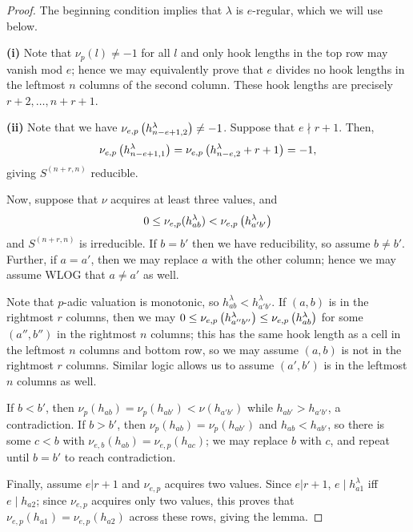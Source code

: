 \documentclass{amsart}
\begin{document}
  \begin{proof}
    The beginning condition implies that $\lambda$ is $e$-regular, which we will use below.

    \textbf{(i)}
    Note that $\nu_p(l) \neq -1$ for all $l$ and only hook lengths in the top row may vanish mod $e$;
    hence we may equivalently prove that $e$ divides no hook lengths in the leftmost $n$ columns of the second column.
    These hook lengths are precisely $r + 2,\dots,n+r+1$.

    \textbf{(ii)}
    Note that we have $\nu_{e,p}\left( h^\lambda_{n-e+1,2} \right) \neq -1$.
    Suppose that $e \nmid r + 1$.
    Then, \[\nu_{e,p}\left( h^\lambda_{n-e+1,1} \right) = \nu_{e,p}\left( h^\lambda_{n-e,2} + r + 1 \right) = -1,\]
    giving $S^{(n+r,n)}$ reducible.

    \def\corsecsep{5pt}
    \vspace{\corsecsep}
    Now, suppose that $\nu$ acquires at least three values, and \[0 \leq \nu_{e,p}(h^{\lambda}_{ab}) < \nu_{e,p}\left( h^{\lambda}_{a'b'} \right)\] and $S^{(n+r,n)}$ is irreducible.
    If $b=b'$ then we have reducibility, so assume $b \neq b'$.
    Further, if $a = a'$, then we may replace $a$ with the other column;
    hence we may assume WLOG that $a \neq a'$ as well.

    Note that $p$-adic valuation is monotonic, so $h^\lambda_{ab} < h^\lambda_{a'b'}$.
    If $(a,b)$ is in the rightmost $r$ columns, then we may $0 \leq \nu_{e,p}\left( h^\lambda_{a''b''} \right) \leq \nu_{e,p}\left( h^\lambda_{ab} \right)$ for some $(a'',b'')$ in the rightmost $n$ columns;
    this has the same hook length as a cell in the leftmost $n$ columns and bottom row, so we may assume $(a,b)$ is not in the rightmost $r$ columns.
    Similar logic allows us to assume $(a',b')$ is in the leftmost $n$ columns as well.

    If $b < b'$, then $\nu_p(h_{ab}) = \nu_p(h_{ab'}) < \nu(h_{a'b'})$ while $h_{ab'} > h_{a'b'}$, a contradiction.
    If $b > b'$, then $\nu_p(h_{ab}) = \nu_p(h_{ab'})$ and $h_{ab} < h_{ab'}$, so there is some $c < b$ with $\nu_{e,b}(h_{ab}) = \nu_{e,p}(h_{ac})$; we may replace $b$ with $c$, and repeat until $b = b'$ to reach contradiction.
    
    \vspace{\corsecsep}
    Finally, assume $e | r + 1$ and $\nu_{e,p}$ acquires two values.
    Since $e | r + 1$, $e \mid h_{a1}^\lambda$ iff $e \mid h_{a2}$;
    since $\nu_{e,p}$ acquires only two values, this proves that $\nu_{e,p}(h_{a1}) = \nu_{e,p}(h_{a2})$ across these rows, giving the lemma.
  \end{proof}
\end{document}
